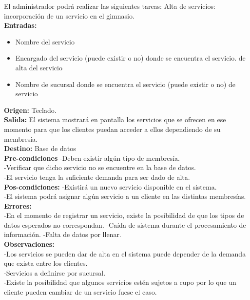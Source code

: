 El administrador podrá realizar las siguientes tareas:
Alta de servicios: incorporación de un servicio en el gimnasio.\\
\textbf{Entradas: } 
    \begin{itemize}
	 \item Nombre del servicio
         \item Encargado del servicio (puede existir o no)
          donde se encuentra el servicio.
	 \itemFecha de alta del servicio
	 \item Nombre de sucursal donde se encuentra el servicio
	 \itemDisponibilidad(puede existir o no)
	 \itemHorario de servicio\\
 \end{itemize}
          
\textbf{Origen: }  Teclado.\\
\textbf{Salida: }  El sistema mostrará en pantalla los servicios que se ofrecen en ese momento para que los clientes puedan acceder a ellos dependiendo de su membresía.\\
\textbf{Destino: }  Base de datos \\
\textbf{Pre-condiciones }  
-Deben existir algún tipo de membresía.\\
-Verificar que dicho servicio no se encuentre en la base de datos.\\
-El servicio tenga la suficiente demanda para ser dado de alta.\\
\textbf{Pos-condiciones: }  
-Existirá un nuevo servicio disponible en el sistema.\\
-El sistema podrá asignar algún servicio a un cliente en las distintas membresías. \\
\textbf{Errores: }  \\
-En el momento de registrar un servicio, existe la posibilidad de que los tipos   de datos esperados  no correspondan.
-Caída de sistema durante el procesamiento de información.
-Falta de datos por llenar.\\
\textbf{Observaciones: }  \\
	 

-Los servicios se pueden dar de alta en el sistema puede depender de la demanda que exista entre los clientes. \\
-Servicios a definirse por sucursal.\\
-Existe la posibilidad que algunos servicios estén sujetos a cupo por lo que un cliente pueden cambiar de un servicio fuese el caso.\\

